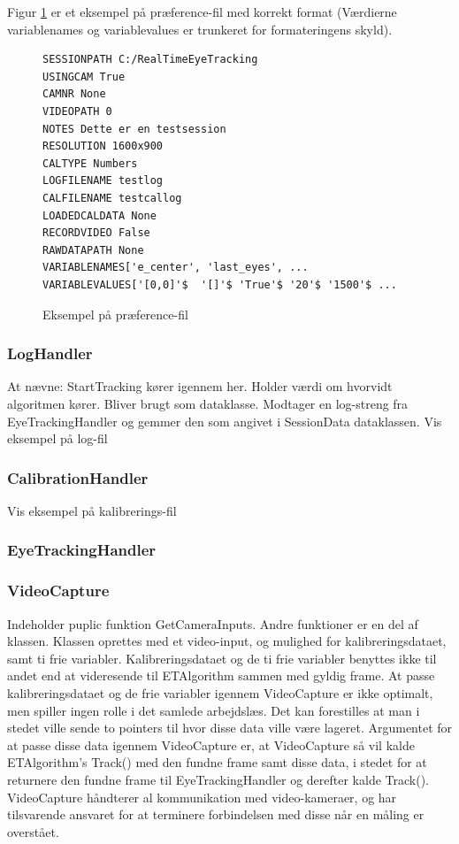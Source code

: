 \documentclass[rapport.tex]{subfiles}
\begin{document}
	Figur \ref{list:sessionfile} er et eksempel på præference-fil med korrekt format (Værdierne variablenames og variablevalues er trunkeret for formateringens skyld). 
\begin{figure}
\caption{Eksempel på præference-fil}
\label{list:sessionfile}
\begin{lstlisting}
SESSIONPATH C:/RealTimeEyeTracking
USINGCAM True
CAMNR None
VIDEOPATH 0
NOTES Dette er en testsession
RESOLUTION 1600x900
CALTYPE Numbers
LOGFILENAME testlog
CALFILENAME testcallog
LOADEDCALDATA None
RECORDVIDEO False
RAWDATAPATH None
VARIABLENAMES['e_center', 'last_eyes', ...
VARIABLEVALUES['[0,0]'$  '[]'$ 'True'$ '20'$ '1500'$ ...
\end{lstlisting}
\end{figure}
		
	\subsubsection{LogHandler}
	At nævne: StartTracking kører igennem her. Holder værdi om hvorvidt algoritmen kører. Bliver brugt som dataklasse. 
	Modtager en log-streng fra EyeTrackingHandler og gemmer den som angivet i SessionData dataklassen. 
	Vis eksempel på log-fil
	
	\subsubsection{CalibrationHandler}
	Vis eksempel på kalibrerings-fil
	
	\subsubsection{EyeTrackingHandler}
	
	
	\subsubsection{VideoCapture}
	Indeholder puplic funktion GetCameraInputs. 
	Andre funktioner er en del af klassen. Klassen oprettes med et video-input, og mulighed for kalibreringsdataet, samt ti frie variabler. Kalibreringsdataet og de ti frie variabler benyttes ikke til andet end at videresende til ETAlgorithm sammen med gyldig frame. 
	At passe kalibreringsdataet og de frie variabler igennem VideoCapture er ikke optimalt, men spiller ingen rolle i det samlede arbejdslæs. Det kan forestilles at man i stedet ville sende to pointers til hvor disse data ville være lageret. Argumentet for at passe disse data igennem VideoCapture er, at VideoCapture så vil kalde ETAlgorithm's Track() med den fundne frame samt disse data, i stedet for at returnere den fundne frame til EyeTrackingHandler og derefter kalde Track(). VideoCapture håndterer al kommunikation med video-kameraer, og har tilsvarende ansvaret for at terminere forbindelsen med disse når en måling er overstået. 
		
\end{document}
